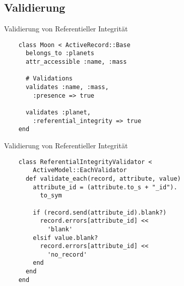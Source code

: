 \subsection{Validierung}

\begin{Frame}[fragile]{Validierung von Referentieller Integrität}
  \begin{lstlisting}
    class Moon < ActiveRecord::Base
      belongs_to :planets
      attr_accessible :name, :mass

      # Validations
      validates :name, :mass, 
        :presence => true
      
      validates :planet, 
        :referential_integrity => true
    end
  \end{lstlisting}
\end{Frame}

\begin{Frame}[fragile]{Validierung von Referentieller Integrität}
  \begin{lstlisting}
    class ReferentialIntegrityValidator < 
        ActiveModel::EachValidator
      def validate_each(record, attribute, value)
        attribute_id = (attribute.to_s + "_id").
          to_sym

        if (record.send(attribute_id).blank?)
          record.errors[attribute_id] << 
            'blank'
        elsif value.blank?
          record.errors[attribute_id] << 
            'no_record'
        end
      end
    end
  \end{lstlisting}
\end{Frame}

